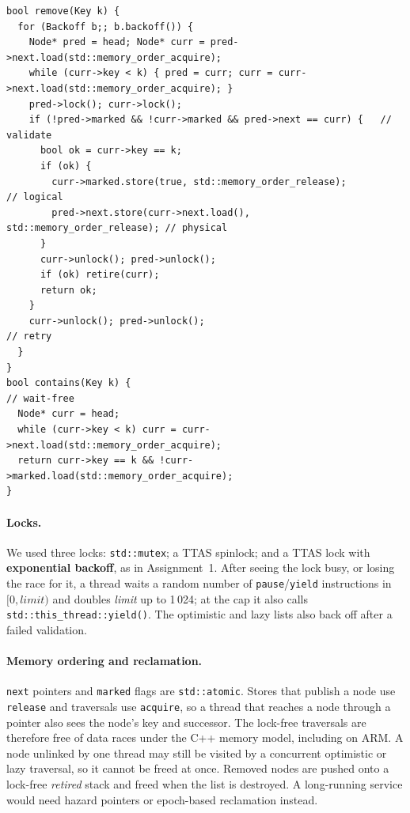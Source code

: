 \begin{lstlisting}
bool remove(Key k) {
  for (Backoff b;; b.backoff()) {
    Node* pred = head; Node* curr = pred->next.load(std::memory_order_acquire);
    while (curr->key < k) { pred = curr; curr = curr->next.load(std::memory_order_acquire); }
    pred->lock(); curr->lock();
    if (!pred->marked && !curr->marked && pred->next == curr) {   // validate
      bool ok = curr->key == k;
      if (ok) {
        curr->marked.store(true, std::memory_order_release);           // logical
        pred->next.store(curr->next.load(), std::memory_order_release); // physical
      }
      curr->unlock(); pred->unlock();
      if (ok) retire(curr);
      return ok;
    }
    curr->unlock(); pred->unlock();                                  // retry
  }
}
bool contains(Key k) {                                               // wait-free
  Node* curr = head;
  while (curr->key < k) curr = curr->next.load(std::memory_order_acquire);
  return curr->key == k && !curr->marked.load(std::memory_order_acquire);
}
\end{lstlisting}

\paragraph{Locks.} We used three locks: \texttt{std::mutex}; a TTAS spinlock;
and a TTAS lock with \textbf{exponential backoff}, as in Assignment~1. After
seeing the lock busy, or losing the race for it, a thread waits a random number
of \texttt{pause}/\texttt{yield} instructions in $[0, \textit{limit})$ and
doubles \textit{limit} up to 1\,024; at the cap it also calls
\texttt{std::this\_thread::yield()}. The optimistic and lazy lists also back
off after a failed validation.

\paragraph{Memory ordering and reclamation.} \texttt{next} pointers and
\texttt{marked} flags are \texttt{std::atomic}. Stores that publish a node use
\texttt{release} and traversals use \texttt{acquire}, so a thread that reaches
a node through a pointer also sees the node's key and successor. The lock-free
traversals are therefore free of data races under the C++ memory model,
including on ARM. A node unlinked by one thread may still be visited by a
concurrent optimistic or lazy traversal, so it cannot be freed at once. Removed
nodes are pushed onto a lock-free \emph{retired} stack and freed when the list
is destroyed. A long-running service would need hazard pointers or epoch-based
reclamation instead.

